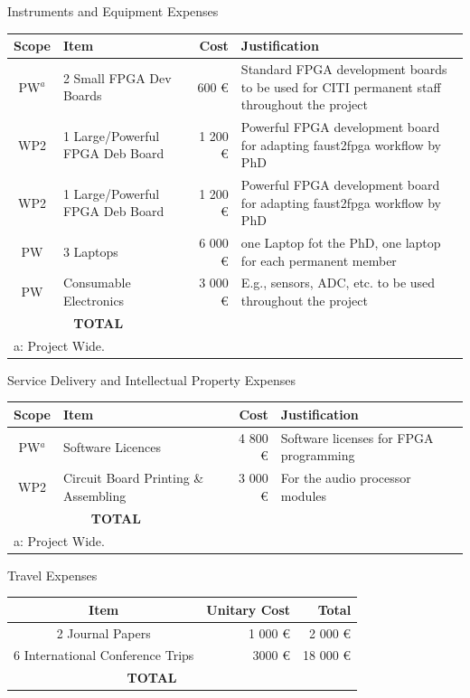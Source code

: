 \documentclass[a4paper,9pt]{extarticle}
\newcommand{\secfont}{\noindent\color{ANRblue}\normalfont\sffamily}
\begin{document}
{\secfont Instruments and Equipment Expenses}


\noindent
\begin{center}
\begin{tabular}{c | p{3cm} | r | p{10cm}}
\textbf{Scope} & \textbf{Item} & \textbf{Cost} & \textbf{Justification}\\
\hline
\hline
PW$^a$ & 2 Small FPGA Dev Boards & 600 \euro{} & Standard FPGA development boards to be used for CITI permanent staff throughout the project\\
\hline
WP2 & 1 Large/Powerful FPGA Deb Board & 1 200 \euro{} & Powerful FPGA development board for adapting faust2fpga workflow by PhD\\
\hline
WP2 & 1 Large/Powerful FPGA Deb Board & 1 200 \euro{} & Powerful FPGA development board for adapting faust2fpga workflow by PhD\\
\hline
PW & 3 Laptops & 6 000 \euro{} & one Laptop fot the PhD, one laptop for each permanent member\\
\hline
PW & Consumable Electronics & 3 000 \euro{} & E.g., sensors, ADC, etc. to be used throughout the project\\
\hline
\hline
\multicolumn{2}{c}{\textbf{TOTAL}} 10 806 \euro{} \\
\hline
\multicolumn{4}{l}{a: Project Wide.}
\end{tabular}
\end{center}

{\secfont Service Delivery and Intellectual Property Expenses}

\noindent
\begin{center}
\begin{tabular}{c | p{3cm} | r | p{10cm}}
\textbf{Scope} & \textbf{Item} & \textbf{Cost} & \textbf{Justification}\\
\hline
\hline
PW$^a$ & Software Licences & 4 800 \euro{} & Software licenses for FPGA programming\\
\hline
WP2 & Circuit Board Printing \& Assembling & 3 000 \euro{} & For the audio processor modules\\
\hline
\hline
\multicolumn{2}{c}{\textbf{TOTAL}} 7 800 \euro{} \\
\hline
\multicolumn{4}{l}{a: Project Wide.}
\end{tabular}
\end{center}

{\secfont Travel Expenses}

\begin{center}
\begin{tabular}{c | r | r}
\textbf{Item} & \textbf{Unitary Cost} & \textbf{Total} \\
\hline
\hline
2 Journal Papers & 1 000 \euro{} & 2 000 \euro{}\\
\hline
6 International Conference Trips & 3000 \euro{} & 18 000 \euro{}\\
\hline
\hline
\multicolumn{2}{c}{\textbf{TOTAL}} 20 000 \euro{} \\
\hline
\end{tabular}
\end{center}
\end{document}
